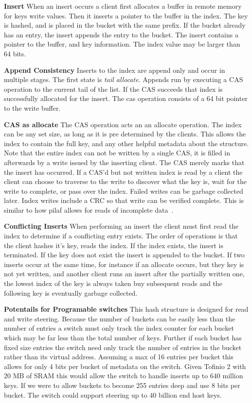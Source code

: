 \textbf{Insert} When an insert occurs a client first allocates a buffer in
remote memory for keys write values. Then it inserts a pointer to the buffer in
the index. The key is hashed, and is placed in the bucket with the same prefix.
If the bucket already has an entry, the insert appends the entry to the bucket.
The insert contains a pointer to the buffer, and key information. The index
value may be larger than 64 bits.

\textbf{Append Consistency} Inserts to the index are append only and occur in
multiple stages. The first state is \textit{tail allocate}. Appends run by
executing a CAS operation to the current tail of the list. If the CAS succeeds
that index is successfully allocated for the insert. The cas operation consists
of a 64 bit pointer to the write buffer.

\textbf{CAS as allocate} The CAS operation acts an an allocate operation. The
index can be any set size, as long as it is pre determined by the clients. This
allows the index to contain the full key, and any other helpful metadata about
the structure. Note that the entire index can not be written by a single CAS, it
is filled in afterwards by a write issued by the inserting client. The CAS
merely marks that the insert has occurred. If a CAS'd but not written index is
read by a client the client can choose to traverse to the write to discover what
the key is, wait for the write to complete, or pass over the index. Failed
writes can be garbage collected later. Index writes include a CRC so that write
can be verified complete. This is similar to how pilaf allows for reads of
incomplete data~\cite{pilaf}.

\textbf{Conflicting Inserts} When performing an insert the client must first
read the index to determine if a conflicting entry exists. The order of
operations is that the client hashes it's key, reads the index. If the index
exists, the insert is terminated. If the key does not exist the insert is
appended to the bucket. If two inserts occur at the same time, for instance if
an allocate occurs, but they key is not yet written, and another client runs an
insert after the partially written one, the lowest index of the key is always
taken buy subsequent reads and the following key is eventually garbage collected.

\textbf{Potentails for Programable switches} This hash structure is designed for
read and write steering. Because the number of buckets can be easily less than
the number of entries a switch must only track the index counter for each bucket
which may be far less than the total number of keys. Further if each bucket has
fixed size entries the switch need only track the number of entries in the
bucket rather than its virtual address. Assuming a max of 16 entries per bucket
this allows for only 4 bits per bucket of metadata on the switch. Given Tofinio
2 with 20 MB of SRAM this would allow the switch to handle inserts up to 640
million keys. If we were to allow buckets to become 255 entries deep and use 8
bits per bucket. The switch could support steering up to 40 billion end host
keys.

